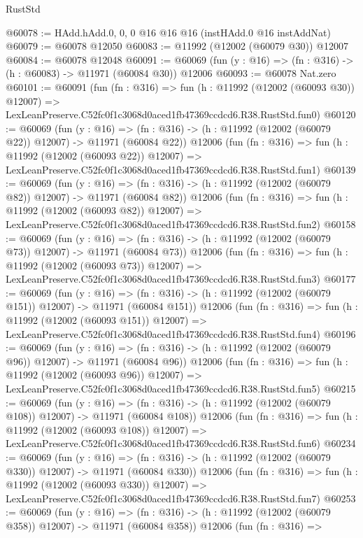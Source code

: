 \begin{lexlean}{RustStd}
\begin{coremodule}
@60078 := HAdd.hAdd.{0, 0, 0} @16 @16 @16 (instHAdd.{0} @16 instAddNat)
@60079 := @60078 @12050
@60083 := @11992 (@12002 (@60079 @30)) @12007
@60084 := @60078 @12048
@60091 := @60069 (fun (y : @16) => (fn : @316) -> (h : @60083) -> @11971 (@60084 @30)) @12006
@60093 := @60078 Nat.zero
@60101 := @60091
    (fun (fn : @316) =>
    fun (h : @11992 (@12002 (@60093 @30)) @12007) =>
    LexLeanPreserve.C52fc0f1c3068d0aced1fb47369ccdcd6.R38.RustStd.fun0)
@60120 := @60069
    (fun (y : @16) =>
    (fn : @316) -> (h : @11992 (@12002 (@60079 @22)) @12007) -> @11971 (@60084 @22))
    @12006
    (fun (fn : @316) =>
    fun (h : @11992 (@12002 (@60093 @22)) @12007) =>
    LexLeanPreserve.C52fc0f1c3068d0aced1fb47369ccdcd6.R38.RustStd.fun1)
@60139 := @60069
    (fun (y : @16) =>
    (fn : @316) -> (h : @11992 (@12002 (@60079 @82)) @12007) -> @11971 (@60084 @82))
    @12006
    (fun (fn : @316) =>
    fun (h : @11992 (@12002 (@60093 @82)) @12007) =>
    LexLeanPreserve.C52fc0f1c3068d0aced1fb47369ccdcd6.R38.RustStd.fun2)
@60158 := @60069
    (fun (y : @16) =>
    (fn : @316) -> (h : @11992 (@12002 (@60079 @73)) @12007) -> @11971 (@60084 @73))
    @12006
    (fun (fn : @316) =>
    fun (h : @11992 (@12002 (@60093 @73)) @12007) =>
    LexLeanPreserve.C52fc0f1c3068d0aced1fb47369ccdcd6.R38.RustStd.fun3)
@60177 := @60069
    (fun (y : @16) =>
    (fn : @316) -> (h : @11992 (@12002 (@60079 @151)) @12007) -> @11971 (@60084 @151))
    @12006
    (fun (fn : @316) =>
    fun (h : @11992 (@12002 (@60093 @151)) @12007) =>
    LexLeanPreserve.C52fc0f1c3068d0aced1fb47369ccdcd6.R38.RustStd.fun4)
@60196 := @60069
    (fun (y : @16) =>
    (fn : @316) -> (h : @11992 (@12002 (@60079 @96)) @12007) -> @11971 (@60084 @96))
    @12006
    (fun (fn : @316) =>
    fun (h : @11992 (@12002 (@60093 @96)) @12007) =>
    LexLeanPreserve.C52fc0f1c3068d0aced1fb47369ccdcd6.R38.RustStd.fun5)
@60215 := @60069
    (fun (y : @16) =>
    (fn : @316) -> (h : @11992 (@12002 (@60079 @108)) @12007) -> @11971 (@60084 @108))
    @12006
    (fun (fn : @316) =>
    fun (h : @11992 (@12002 (@60093 @108)) @12007) =>
    LexLeanPreserve.C52fc0f1c3068d0aced1fb47369ccdcd6.R38.RustStd.fun6)
@60234 := @60069
    (fun (y : @16) =>
    (fn : @316) -> (h : @11992 (@12002 (@60079 @330)) @12007) -> @11971 (@60084 @330))
    @12006
    (fun (fn : @316) =>
    fun (h : @11992 (@12002 (@60093 @330)) @12007) =>
    LexLeanPreserve.C52fc0f1c3068d0aced1fb47369ccdcd6.R38.RustStd.fun7)
@60253 := @60069
    (fun (y : @16) =>
    (fn : @316) -> (h : @11992 (@12002 (@60079 @358)) @12007) -> @11971 (@60084 @358))
    @12006
    (fun (fn : @316) =>

\end{coremodule}
\end{lexlean}
